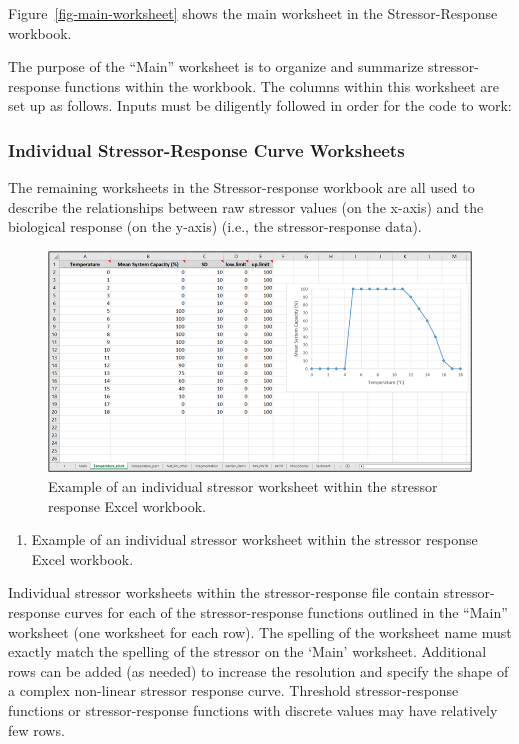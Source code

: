 \documentclass[
  letterpaper,
  DIV=11,
  numbers=noendperiod]{scrreprt}
\providecommand{\tightlist}{%
  \setlength{\itemsep}{0pt}\setlength{\parskip}{0pt}}\usepackage{longtable,booktabs,array}
\begin{document}
Figure~\ref{fig-main-worksheet} shows the main worksheet in the
Stressor-Response workbook.

The purpose of the ``Main'' worksheet is to organize and summarize
stressor-response functions within the workbook. The columns within this
worksheet are set up as follows. Inputs must be diligently followed in
order for the code to work:

\hypertarget{individual-stressor-response-curve-worksheets}{%
\subsubsection{Individual Stressor-Response Curve
Worksheets}\label{individual-stressor-response-curve-worksheets}}

The remaining worksheets in the Stressor-response workbook are all used
to describe the relationships between raw stressor values (on the
x-axis) and the biological response (on the y-axis) (i.e., the
stressor-response data).

\begin{figure}

{\centering \includegraphics{images/image020.png}

}

\caption{\label{fig-individual-stressor}Example of an individual
stressor worksheet within the stressor response Excel workbook.}

\end{figure}

\begin{enumerate}
\def\labelenumi{\arabic{enumi}.}
\tightlist
\item
  Example of an individual stressor worksheet within the stressor
  response Excel workbook.
\end{enumerate}

Individual stressor worksheets within the stressor-response file contain
stressor-response curves for each of the stressor-response functions
outlined in the ``Main'' worksheet (one worksheet for each row). The
spelling of the worksheet name must exactly match the spelling of the
stressor on the `Main' worksheet. Additional rows can be added (as
needed) to increase the resolution and specify the shape of a complex
non-linear stressor response curve. Threshold stressor-response
functions or stressor-response functions with discrete values may have
relatively few rows.
\end{document}
